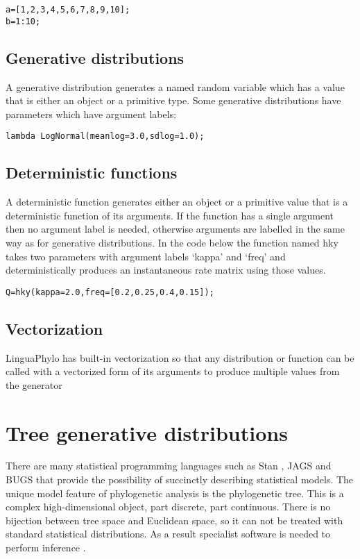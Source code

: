 \documentclass[10pt,letterpaper,table]{article}
\begin{document}
\begin{alltt}
  a = [1, 2, 3, 4, 5, 6, 7, 8, 9, 10];
  b = 1:10;
\end{alltt}

\subsection*{Generative distributions}

A generative distribution generates a named random variable which has a value that is either an object or a primitive type. Some generative distributions have parameters which have argument labels:

{\singlespacing
\begin{alltt}
  lambda ~ LogNormal(meanlog=3.0, sdlog=1.0);
\end{alltt}
}

\subsection*{Deterministic functions}

A deterministic function generates either an object or a primitive value that is a deterministic function of its arguments. If the function has a single argument then no argument label is needed, otherwise arguments are labelled in the same way as for generative distributions. In the code below the function named hky takes two parameters with argument labels `kappa' and `freq' and deterministically produces an instantaneous rate matrix using those values.

{\singlespacing
\begin{alltt}
  Q = hky(kappa=2.0, freq=[0.2, 0.25, 0.4, 0.15]);
\end{alltt}
}

\subsection*{Vectorization}

LinguaPhylo has built-in vectorization so that any distribution or function can be called with a vectorized form of its arguments to produce multiple values from the generator

\section*{Tree generative distributions}

There are many statistical programming languages such as Stan
\cite{carpenter2017stan}, JAGS \cite{plummer2003jags} and BUGS \cite{lunn2009bugs, gilks1994language} that provide the possibility
of succinctly describing statistical models. The unique model feature of
phylogenetic analysis is the phylogenetic tree.
This is a complex high-dimensional object, part discrete, part
continuous.
There is no bijection between tree space and Euclidean space, so it
can not be treated with standard statistical distributions.
As a result specialist software is needed to perform inference \cite{hohna2016revbayes,bouckaert2019beastanalysis}.
\end{document}
